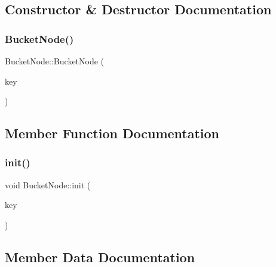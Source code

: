 \subsection{Constructor \& Destructor Documentation}
\mbox{\label{classBucketNode_a30b8167df2daa7dcc5bbcf4b9e7cae6a}} 
\subsubsection{\texorpdfstring{Bucket\+Node()}{BucketNode()}}
{\footnotesize\ttfamily Bucket\+Node\+::\+Bucket\+Node (\begin{DoxyParamCaption}\item[{\hyperlink{index__base_8h_ae35c40bc2f912c11f0e36ac66cba4489}{K\+E\+Y\+\_\+\+T\+Y\+PE}}]{key }\end{DoxyParamCaption})\hspace{0.3cm}{\ttfamily [inline]}}



\subsection{Member Function Documentation}
\mbox{\label{classBucketNode_aed4c88c4dde6d7b7a9274f4a3259e48b}} 
\subsubsection{\texorpdfstring{init()}{init()}}
{\footnotesize\ttfamily void Bucket\+Node\+::init (\begin{DoxyParamCaption}\item[{\hyperlink{index__base_8h_ae35c40bc2f912c11f0e36ac66cba4489}{K\+E\+Y\+\_\+\+T\+Y\+PE}}]{key }\end{DoxyParamCaption})\hspace{0.3cm}{\ttfamily [inline]}}



\subsection{Member Data Documentation}
\mbox{\label{classBucketNode_a8299d0a598880b114ba06dbd667d8d0f}} 

